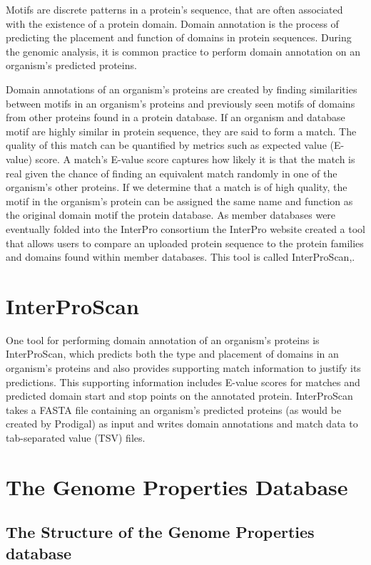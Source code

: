 Motifs are discrete patterns in a protein's sequence, that are often associated with the existence of a protein domain. Domain annotation is the process of predicting the placement and function of domains in protein sequences. During the genomic analysis, it is common practice to perform domain annotation on an organism's predicted proteins.

Domain annotations of an organism's proteins are created by finding similarities between motifs in an organism's proteins and previously seen motifs of domains from other proteins found in a protein database. If an organism and database motif are highly similar in protein sequence, they are said to form a match. The quality of this match can be quantified by metrics such as expected value (E-value) score. A match's E-value score captures how likely it is that the match is real given the chance of finding an equivalent match randomly in one of the organism's other proteins. If we determine that a match is of high quality, the motif in the organism's protein can be assigned the same name and function as the original domain motif the protein database. As member databases were eventually folded into the InterPro consortium the InterPro website created a tool that allows users to compare an uploaded protein sequence to the protein families and domains found within member databases. This tool is called InterProScan,.

\section{InterProScan}

One tool for performing domain annotation of an organism's proteins is InterProScan, which predicts both the type and placement of domains in an organism's proteins and also provides supporting match information to justify its predictions. This supporting information includes E-value scores for matches and predicted domain start and stop points on the annotated protein. InterProScan takes a FASTA file \cite{pearson19905} containing an organism's predicted proteins (as would be created by Prodigal) as input and writes domain annotations and match data to tab-separated value (TSV) files.

\section{The Genome Properties Database}

\subsection{The Structure of the Genome Properties database}


